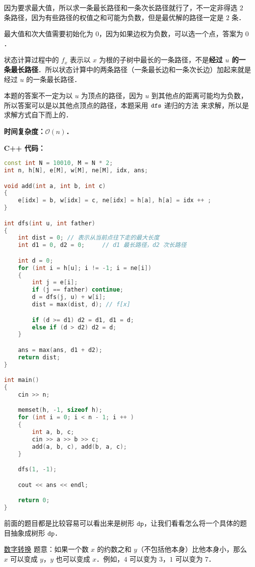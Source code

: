 因为要求最大值，所以求一条最长路径和一条次长路径就行了，不一定非得选 $2$ 条路径，因为有些路径的权值之和可能为负数，但是最优解的路径一定是 $2$ 条．

最大值和次大值需要初始化为 $0$，因为如果边权为负数，可以选一个点，答案为 $0$．

状态计算过程中的 $f_x$ 表示以 $x$ 为根的子树中最长的一条路径，不是\textbf{经过 $u$ 的一条最长路径}．所以状态计算中的两条路径（一条最长边和一条次长边）加起来就是经过 $u$ 的一条最长路径．

本题的答案不一定为以 $u$ 为顶点的路径，因为 $u$ 到其他点的距离可能均为负数，所以答案可以是以其他点顶点的路径，本题采用 $\tt dfs$ 递归的方法 来求解，所以是求解方式自下而上的．

\textbf{时间复杂度：$\mathcal{O}(n)$．}

\textbf{C++ 代码：}

\begin{lstlisting}[language=cpp]
const int N = 10010, M = N * 2;
int n, h[N], e[M], w[M], ne[M], idx, ans;

void add(int a, int b, int c)
{
    e[idx] = b, w[idx] = c, ne[idx] = h[a], h[a] = idx ++ ;
}

int dfs(int u, int father)
{
    int dist = 0; // 表示从当前点往下走的最大长度
    int d1 = 0, d2 = 0;     // d1 最长路径，d2 次长路径

    int d = 0;
    for (int i = h[u]; i != -1; i = ne[i])
    {
        int j = e[i];
        if (j == father) continue;
        d = dfs(j, u) + w[i];
        dist = max(dist, d); // f[x]

        if (d >= d1) d2 = d1, d1 = d;
        else if (d > d2) d2 = d;
    }

    ans = max(ans, d1 + d2);
    return dist;
}

int main()
{
    cin >> n;

    memset(h, -1, sizeof h);
    for (int i = 0; i < n - 1; i ++ )
    {
        int a, b, c;
        cin >> a >> b >> c;
        add(a, b, c), add(b, a, c);
    }

    dfs(1, -1);

    cout << ans << endl;

    return 0;
}
\end{lstlisting}

前面的题目都是比较容易可以看出来是树形 $\texttt{dp}$，让我们看看怎么将一个具体的题目抽象成树形 $\texttt{dp}$．

\href{http://ybt.ssoier.cn:8088/problem_show.php?pid=1577}{数字转换} 题意：如果一个数 $x$ 的约数之和 $y$（不包括他本身）比他本身小，那么 $x$ 可以变成 $y$，$y$ 也可以变成 $x$．例如，$4$ 可以变为 $3$，$1$ 可以变为 $7$．

